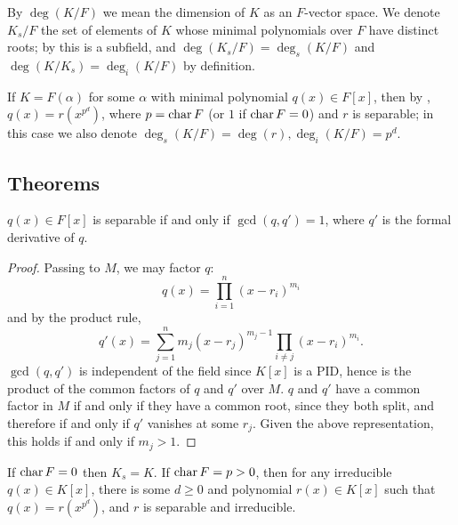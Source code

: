 \begin{definition} By $\deg(K/F)$ we mean the dimension of $K$ as an $F$-vector
space.  We denote $K_s/F$ the set of elements of $K$ whose minimal polynomials
over $F$ have distinct roots; by  this is a subfield, and
$\deg(K_s/F) = \deg_s(K/F)$ and $\deg(K/K_s) = \deg_i(K/F)$ by definition.
\label{def:sep}
\end{definition}

\begin{definition} If $K = F(\alpha)$ for some $\alpha$ with minimal polynomial
$q(x) \in F[x]$, then by , $q(x) = r(x^{p^d})$, where $p =
\operatorname{\text{char}}{F}$ (or $1$ if $\operatorname{\text{char}}{F} = 0$) and $r$ is separable; in this case we
also denote $\deg_s(K/F) = \deg(r), \deg_i(K/F) = p^d$.  \label{def:prim_sep}
\end{definition}

\subsection{Theorems}

\begin{lemma} $q(x) \in F[x]$ is separable if and only if $\gcd(q, q') = 1$,
where $q'$ is the formal derivative of $q$. 
\label{der_poly}
\end{lemma}

\begin{proof} Passing to $M$, we may factor $q$:
\begin{equation*}
q(x) = \prod_{i = 1}^n (x - r_i)^{m_i}
\end{equation*}
and by the product rule,
\begin{equation*}
q'(x) = \sum_{j = 1}^n m_j (x - r_j)^{m_j - 1} \prod_{i \neq j} (x -
	r_i)^{m_i}.
\end{equation*}
$\gcd(q, q')$ is independent of the field since $K[x]$ is a PID, hence is the
product of the common factors of $q$ and $q'$ over $M$.  $q$ and $q'$ have a
common factor in $M$ if and only if they have a common root, since they both
split, and therefore if and only if $q'$ vanishes at some $r_j$.  Given the
above representation, this holds if and only if $m_j > 1$. \end{proof}

\begin{lemma} If $\operatorname{\text{char}}{F} = 0$ then $K_s = K$.  If $\operatorname{\text{char}}{F} = p > 0$, then for
any irreducible $q(x) \in K[x]$, there is some $d \geq 0$ and polynomial $r(x)
\in K[x]$ such that $q(x) = r(x^{p^d})$, and $r$ is separable and irreducible.
\label{sep_poly}
\end{lemma}

